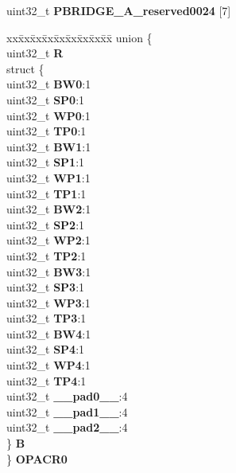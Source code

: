 \begin{DoxyCompactItemize}
\begin{tabbing}
\end{tabbing}\item 
\mbox{\label{structPBRIDGE__A__tag_a048340260c1f950b259f449af15a2139}} 
uint32\+\_\+t {\bfseries P\+B\+R\+I\+D\+G\+E\+\_\+\+A\+\_\+reserved0024} \mbox{[}7\mbox{]}
\item 
\mbox{\label{structPBRIDGE__A__tag_ac310b177bbba06fe7cee01699f2ea171}} 
\begin{tabbing}
xx\=xx\=xx\=xx\=xx\=xx\=xx\=xx\=xx\=\kill
union \{\\
\>uint32\_t {\bfseries R}\\
\>struct \{\\
\>\>uint32\_t {\bfseries BW0}:1\\
\>\>uint32\_t {\bfseries SP0}:1\\
\>\>uint32\_t {\bfseries WP0}:1\\
\>\>uint32\_t {\bfseries TP0}:1\\
\>\>uint32\_t {\bfseries BW1}:1\\
\>\>uint32\_t {\bfseries SP1}:1\\
\>\>uint32\_t {\bfseries WP1}:1\\
\>\>uint32\_t {\bfseries TP1}:1\\
\>\>uint32\_t {\bfseries BW2}:1\\
\>\>uint32\_t {\bfseries SP2}:1\\
\>\>uint32\_t {\bfseries WP2}:1\\
\>\>uint32\_t {\bfseries TP2}:1\\
\>\>uint32\_t {\bfseries BW3}:1\\
\>\>uint32\_t {\bfseries SP3}:1\\
\>\>uint32\_t {\bfseries WP3}:1\\
\>\>uint32\_t {\bfseries TP3}:1\\
\>\>uint32\_t {\bfseries BW4}:1\\
\>\>uint32\_t {\bfseries SP4}:1\\
\>\>uint32\_t {\bfseries WP4}:1\\
\>\>uint32\_t {\bfseries TP4}:1\\
\>\>uint32\_t {\bfseries \_\_pad0\_\_}:4\\
\>\>uint32\_t {\bfseries \_\_pad1\_\_}:4\\
\>\>uint32\_t {\bfseries \_\_pad2\_\_}:4\\
\>\} {\bfseries B}\\
\} {\bfseries OPACR0}\\


\end{tabbing}
\end{DoxyCompactItemize}
